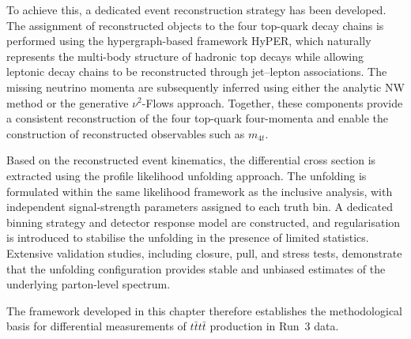 To achieve this, a dedicated event reconstruction strategy has been developed. 
The assignment of reconstructed objects to the four top-quark decay chains is performed using the hypergraph-based framework HyPER, which naturally represents the multi-body structure of hadronic top decays while allowing leptonic decay chains to be reconstructed through jet–lepton associations. 
The missing neutrino momenta are subsequently inferred using either the analytic NW method or the generative $\nu^2$-Flows approach. 
Together, these components provide a consistent reconstruction of the four top-quark four-momenta and enable the construction of reconstructed observables such as $m_{4t}$.

Based on the reconstructed event kinematics, the differential cross section is extracted using the profile likelihood unfolding approach. 
The unfolding is formulated within the same likelihood framework as the inclusive analysis, with independent signal-strength parameters assigned to each truth bin. 
A dedicated binning strategy and detector response model are constructed, and regularisation is introduced to stabilise the unfolding in the presence of limited statistics. 
Extensive validation studies, including closure, pull, and stress tests, demonstrate that the unfolding configuration provides stable and unbiased estimates of the underlying parton-level spectrum.

The framework developed in this chapter therefore establishes the methodological basis for differential measurements of $t\bar{t}t\bar{t}$ production in Run~3 data.